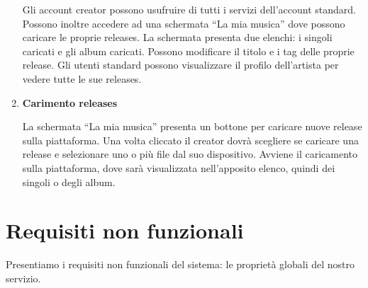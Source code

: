 \documentclass[a4paper,12pt]{article}
\begin{document}
\begin{enumerate}[label=\textbf{RF\arabic*}\;, ref=\textbf{RF\arabic*}]
    Gli account creator possono usufruire di tutti i servizi dell’account standard. Possono inoltre accedere ad una schermata “La mia musica” dove possono caricare le proprie releases. La schermata presenta due elenchi: i singoli caricati e gli album caricati. Possono modificare il titolo e i tag delle proprie release. Gli utenti standard possono visualizzare il profilo dell’artista per vedere tutte le sue releases.
    \item \label{itm:rf15} \textbf{Carimento releases}
    
    La schermata “La mia musica” presenta un bottone per caricare nuove release sulla piattaforma. Una volta cliccato il creator dovrà scegliere se caricare una release e selezionare uno o più file dal suo dispositivo. Avviene il caricamento sulla piattaforma, dove sarà visualizzata nell’apposito elenco, quindi dei singoli o degli album.
\end{enumerate}

\newpage
\section{Requisiti non funzionali}

Presentiamo i requisiti non funzionali del sistema: le proprietà globali del nostro servizio.
\end{document}

